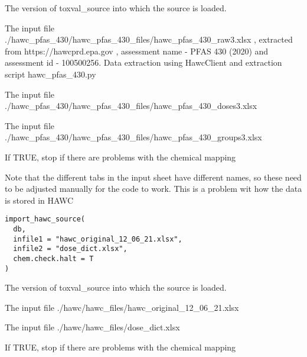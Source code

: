 \documentclass[letterpaper]{book}
\begin{document}
\begin{Arguments}
\begin{ldescription}
\item[\code{db}] The version of toxval\_source into which the source is loaded.

\item[\code{infile1}] The input file ./hawc\_pfas\_430/hawc\_pfas\_430\_files/hawc\_pfas\_430\_raw3.xlsx , extracted
from https://hawcprd.epa.gov , assessment name - PFAS 430 (2020) and assessment id - 100500256.
Data extraction using HawcClient and extraction script hawc\_pfas\_430.py

\item[\code{infile2}] The input file ./hawc\_pfas\_430/hawc\_pfas\_430\_files/hawc\_pfas\_430\_doses3.xlsx

\item[\code{infile3}] The input file ./hawc\_pfas\_430/hawc\_pfas\_430\_files/hawc\_pfas\_430\_groups3.xlsx

\item[\code{chem.check.halt}] If TRUE, stop if there are problems with the chemical mapping
\end{ldescription}
\end{Arguments}
%
\begin{Description}\relax
Note that the different tabs in the input sheet have different names, so these need
to be adjusted manually for the code to work. This is a problem wit how the data
is stored in HAWC
\end{Description}
%
\begin{Usage}
\begin{verbatim}
import_hawc_source(
  db,
  infile1 = "hawc_original_12_06_21.xlsx",
  infile2 = "dose_dict.xlsx",
  chem.check.halt = T
)
\end{verbatim}
\end{Usage}
%
\begin{Arguments}
\begin{ldescription}
\item[\code{db}] The version of toxval\_source into which the source is loaded.

\item[\code{infile1}] The input file ./hawc/hawc\_files/hawc\_original\_12\_06\_21.xlsx

\item[\code{infile2}] The input file ./hawc/hawc\_files/dose\_dict.xlsx

\item[\code{chem.check.halt}] If TRUE, stop if there are problems with the chemical mapping
\end{ldescription}
\end{Arguments}
\end{document}
